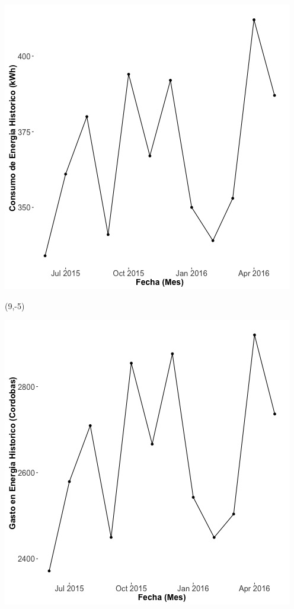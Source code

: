 \documentclass{article}\usepackage[]{graphicx}\usepackage[]{color}
\newenvironment{knitrout}{}{} %
\begin{document}
\begin{knitrout}
\color{fgcolor}
\includegraphics[scale=0.65]{figure/A16_historico_energia} 
\end{knitrout}

 \begin{textblock}{1}(9,-5)
\begin{minipage}{20em}
\begingroup

\endgroup
\end{minipage}
\end{textblock}

\begin{knitrout}
\color{fgcolor}
\includegraphics[scale=0.65]{figure/A16_historico_cordobas} 
\end{knitrout}
\end{document}
